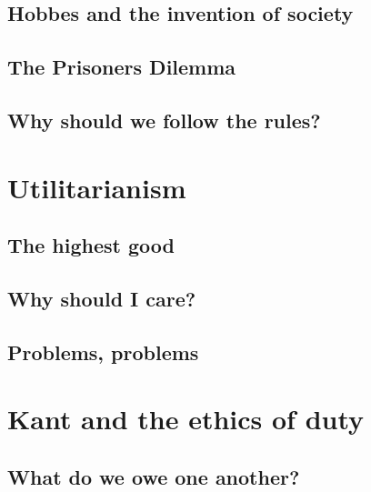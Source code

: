 \documentclass[justified]{tufte-book}
\begin{document}
\hypertarget{hobbes-and-the-invention-of-society}{%
\section{Hobbes and the invention of society}\label{hobbes-and-the-invention-of-society}}

\hypertarget{the-prisoners-dilemma}{%
\section{The Prisoners Dilemma}\label{the-prisoners-dilemma}}

\hypertarget{why-should-we-follow-the-rules}{%
\section{Why should we follow the rules?}\label{why-should-we-follow-the-rules}}

\hypertarget{utilitarianism}{%
\chapter{Utilitarianism}\label{utilitarianism}}

\hypertarget{the-highest-good}{%
\section{The highest good}\label{the-highest-good}}

\hypertarget{why-should-i-care}{%
\section{Why should I care?}\label{why-should-i-care}}

\hypertarget{problems-problems}{%
\section{Problems, problems}\label{problems-problems}}

\hypertarget{kant-and-the-ethics-of-duty}{%
\chapter{Kant and the ethics of duty}\label{kant-and-the-ethics-of-duty}}

\hypertarget{what-do-we-owe-one-another}{%
\section{What do we owe one another?}\label{what-do-we-owe-one-another}}
\end{document}
